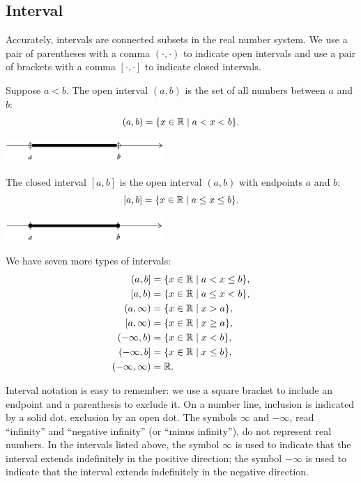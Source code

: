 \documentclass[11pt]{book}
\begin{document}
\subsection*{Interval}

Accurately, intervals are connected subsets in the real number system. We use a pair of parentheses with a comma $(\cdot, \cdot)$ to indicate open intervals and use a pair of brackets with a comma $[\cdot, \cdot]$ to indicate closed intervals.

Suppose $a<b$. The open interval $(a, b)$ is the set of all numbers between $a$ and $b$: $$(a, b)=\{x\in\mathbb{R}\mid a<x<b\}.$$
\begin{center}
    \includegraphics[width=0.45\textwidth]{interval_oo.JPG}
\end{center}
The closed interval $[a, b]$ is the open interval $(a, b)$ with endpoints $a$ and $b$: $$[a, b]=\{x\in\mathbb{R}\mid a\leq x\leq b\}.$$
\begin{center}
    \includegraphics[width=0.45\textwidth]{interval_cc.JPG}
\end{center} We have seven more types of intervals: \begin{align*}
    (a, b]&=\{x\in\bbR\mid a<x\leq b\},\\
    [a, b)&=\{x\in\bbR\mid a\leq x<b\},\\
    (a, \infty)&=\{x\in\bbR\mid x>a\},\\
    [a, \infty)&=\{x\in\bbR\mid x\geq a\},\\
    (-\infty, b)&=\{x\in\bbR\mid x<b\},\\
    (-\infty, b]&=\{x\in\bbR\mid x\leq b\},\\
    (-\infty, \infty)&=\bbR.
\end{align*}

Interval notation is easy to remember: we use a square bracket to include an endpoint and a parenthesis to exclude it. On a number line, inclusion is indicated by a solid dot, exclusion by an open dot. The symbols $\infty$ and $-\infty$, read “infinity” and “negative infinity” (or “minus infinity”), do not represent real numbers. In the intervals listed above, the symbol $\infty$ is used to indicate that the interval extends indefinitely in the positive direction; the symbol $-\infty$ is used to indicate that the interval extends indefinitely in the negative direction.
\end{document}
